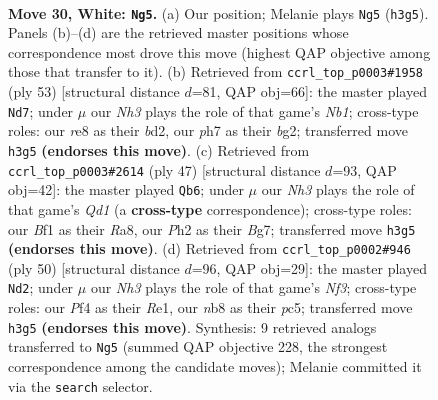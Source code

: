 \documentclass[11pt]{article}
\begin{document}
\clearpage

\begin{figure}[p]\centering
\begin{subfigure}{0.46\textwidth}\centering
\resizebox{\linewidth}{!}{%
\newchessgame
\chessboard[
  setfen={1n2r1k1/3b1ppp/8/4Pp2/p4P2/2q4N/P1P2KPP/1Q3B1R w - - 2 30},
  showmover=false,
  pgfstyle=straightmove, color=movearrow, markmove={h3-g5}
]}
\caption{}
\end{subfigure}\hfill
\begin{subfigure}{0.46\textwidth}\centering
\resizebox{\linewidth}{!}{%
\newchessgame
\chessboard[
  setfen={1nb2rk1/7p/1q2p1p1/2p1Qp2/5P1P/3P2P1/3B2BK/5R2 b - - 0 27},
  showmover=false,
  pgfstyle=straightmove, color=movearrow, markmove={b8-d7}
]}
\caption{}
\end{subfigure}
\\[4pt]
\begin{subfigure}{0.46\textwidth}\centering
\resizebox{\linewidth}{!}{%
\newchessgame
\chessboard[
  setfen={r2q2k1/p4pb1/4b1pp/1PQ5/P2p4/5N2/3B1PPP/2R3K1 b - - 1 24},
  showmover=false,
  pgfstyle=straightmove, color=movearrow, markmove={d8-b6}
]}
\caption{}
\end{subfigure}\hfill
\begin{subfigure}{0.46\textwidth}\centering
\resizebox{\linewidth}{!}{%
\newchessgame
\chessboard[
  setfen={r5k1/3q1p2/p2b1p1p/2pb4/Pp6/1P3N1P/2Q2PP1/4RBK1 w - - 0 26},
  showmover=false,
  pgfstyle=straightmove, color=movearrow, markmove={f3-d2}
]}
\caption{}
\end{subfigure}
\caption{\textbf{Move 30, White: \texttt{Ng5}.} (a) Our position; Melanie plays \texttt{Ng5} (\texttt{h3g5}). Panels (b)--(d) are the retrieved master positions whose correspondence most drove this move (highest QAP objective among those that transfer to it). (b) Retrieved from \texttt{ccrl\_top\_p0003\#1958} (ply 53) [structural distance $d$=81, QAP obj=66]: the master played \texttt{Nd7}; under $\mu$ our \emph{Nh3} plays the role of that game's \emph{Nb1}; cross-type roles: our \emph{r}e8 as their \emph{b}d2, our \emph{p}h7 as their \emph{b}g2; transferred move \texttt{h3g5} \textbf{(endorses this move)}. (c) Retrieved from \texttt{ccrl\_top\_p0003\#2614} (ply 47) [structural distance $d$=93, QAP obj=42]: the master played \texttt{Qb6}; under $\mu$ our \emph{Nh3} plays the role of that game's \emph{Qd1} (a \textbf{cross-type} correspondence); cross-type roles: our \emph{B}f1 as their \emph{R}a8, our \emph{P}h2 as their \emph{B}g7; transferred move \texttt{h3g5} \textbf{(endorses this move)}. (d) Retrieved from \texttt{ccrl\_top\_p0002\#946} (ply 50) [structural distance $d$=96, QAP obj=29]: the master played \texttt{Nd2}; under $\mu$ our \emph{Nh3} plays the role of that game's \emph{Nf3}; cross-type roles: our \emph{P}f4 as their \emph{R}e1, our \emph{n}b8 as their \emph{p}c5; transferred move \texttt{h3g5} \textbf{(endorses this move)}. Synthesis: 9 retrieved analogs transferred to \texttt{Ng5} (summed QAP objective 228, the strongest correspondence among the candidate moves); Melanie committed it via the \texttt{search} selector.}
\label{fig:thought-m58}
\end{figure}
\end{document}
